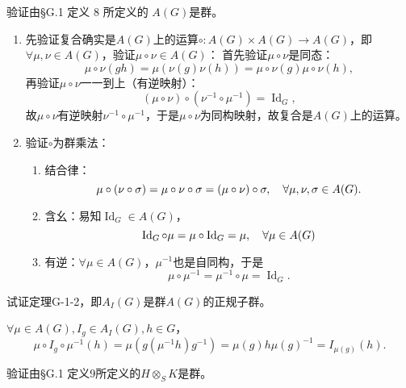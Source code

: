 \begin{xiti}
    \item 验证由\S G.1 定义 8 所定义的 $A(G) $是群。
    
    \begin{zm}
    	\begin{enumerate}
    		\item 先验证复合确实是$A(G) $上的运算$\circ\colon A(G)\times A(G) \rightarrow A(G) $，即$\forall \mu,\nu \in A(G) $，验证$\mu \circ \nu \in A(G) $：
    		首先验证$\mu\circ \nu $是同态：\[ \mu\circ \nu (gh)=\mu\left( \nu(g) \nu(h) \right) =\mu\circ \nu (g) \mu\circ \nu(h), \]
    		再验证$\mu\circ \nu $一一到上（有逆映射）：\[ \left(\mu\circ \nu\right) \circ \left(\nu^{-1} \circ \mu^{-1}\right) = \operatorname{Id}_G, \]
    		故$\mu\circ\nu $有逆映射$\nu^{-1} \circ \mu^{-1} $，于是$\mu\circ\nu$为同构映射，故复合是$A(G)$上的运算。
    		\item 验证$\circ$为群乘法：
    		\begin{enumerate}
    			\item 结合律：\[ \mu \circ \left( \nu \circ \sigma \right) =\mu \circ \nu \circ \sigma = \left( \mu \circ \nu \right) \circ \sigma\qc \forall \mu,\nu,\sigma \in A(G). \]
    			\item 含幺：易知$\operatorname{Id}_G \in A(G) $，\[ \operatorname{Id}_G \circ \mu = \mu \circ \operatorname{Id}_{G} = \mu\qc \forall \mu \in A(G) \]
    			\item 有逆：$\forall \mu \in A(G) $，$\mu^{-1}$也是自同构，于是\[ \mu \circ \mu^{-1} = \mu^{-1} \circ \mu = \operatorname{Id}_G. \]
    		\end{enumerate}
    	\end{enumerate}
    \end{zm}

    \item 试证定理G-1-2，即$A_I(G)$是群$A(G)$的正规子群。
    
    \begin{zm}
    	$\forall \mu \in A(G),I_g\in A_I(G),h\in G $，\[ \mu\circ I_g \circ \mu^{-1} (h) =\mu \left( g (\mu^{-1} h) g^{-1} \right) = \mu(g) h \mu(g)^{-1} = I_{\mu(g)}(h) . \]
    \end{zm}
    
    \item 验证由\S G.1 定义9所定义的$H \otimes_S K $是群。
    

\end{xiti}
